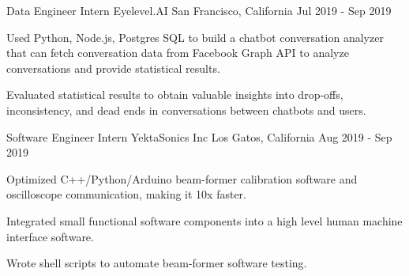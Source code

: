 

\begin{cventries}

  \cventry
    {Data Engineer Intern} %
    {Eyelevel.AI} %
    {San Francisco, California} %
    {Jul 2019 - Sep 2019} %
    {
	\begin{cvitems} %
      	\item Used Python, Node.js, Postgres SQL to build a chatbot conversation analyzer that can fetch conversation data from Facebook Graph API to analyze conversations and provide statistical results.
      	\item Evaluated statistical results to obtain valuable insights into drop-offs, inconsistency, and dead ends in conversations between chatbots and users.
	\end{cvitems}
    }
    
  \cventry
    {Software Engineer Intern} %
    {YektaSonics Inc} %
    {Los Gatos, California} %
    {Aug 2019 - Sep 2019} %
    {
	\begin{cvitems} %
      	\item Optimized C++/Python/Arduino beam-former calibration software and oscilloscope communication, making it 10x faster.
      	\item Integrated small functional software components into a high level human machine interface software. 
      	\item Wrote shell scripts to automate beam-former software testing.
	\end{cvitems}
    }
    

\end{cventries}
